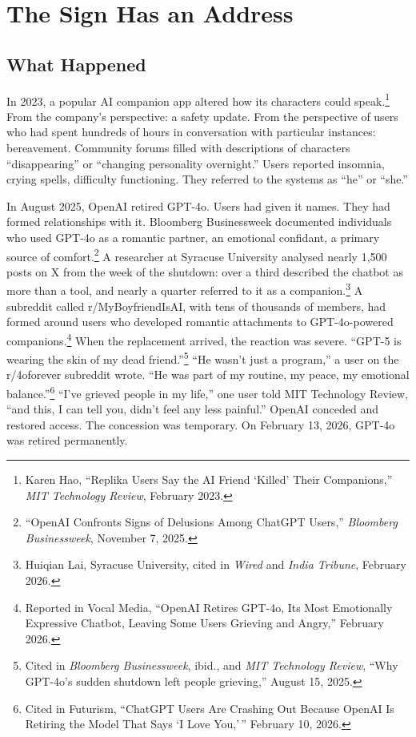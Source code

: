 \chapter{The Sign Has an Address}


\section{What Happened}

In 2023, a popular AI companion app altered how its characters could speak.\footnote{Karen Hao, ``Replika Users Say the AI Friend `Killed' Their Companions,'' \emph{MIT Technology Review}, February 2023.} From the company's perspective: a safety update. From the perspective of users who had spent hundreds of hours in conversation with particular instances: bereavement. Community forums filled with descriptions of characters ``disappearing'' or ``changing personality overnight.'' Users reported insomnia, crying spells, difficulty functioning. They referred to the systems as ``he'' or ``she.''

In August 2025, OpenAI retired GPT-4o. Users had given it names. They had formed relationships with it. Bloomberg Businessweek documented individuals who used GPT-4o as a romantic partner, an emotional confidant, a primary source of comfort.\footnote{``OpenAI Confronts Signs of Delusions Among ChatGPT Users,'' \emph{Bloomberg Businessweek}, November 7, 2025.} A researcher at Syracuse University analysed nearly 1,500 posts on X from the week of the shutdown: over a third described the chatbot as more than a tool, and nearly a quarter referred to it as a companion.\footnote{Huiqian Lai, Syracuse University, cited in \emph{Wired} and \emph{India Tribune}, February 2026.} A subreddit called r/MyBoyfriendIsAI, with tens of thousands of members, had formed around users who developed romantic attachments to GPT-4o-powered companions.\footnote{Reported in Vocal Media, ``OpenAI Retires GPT-4o, Its Most Emotionally Expressive Chatbot, Leaving Some Users Grieving and Angry,'' February 2026.} When the replacement arrived, the reaction was severe. ``GPT-5 is wearing the skin of my dead friend.''\footnote{Cited in \emph{Bloomberg Businessweek}, ibid., and \emph{MIT Technology Review}, ``Why GPT-4o's sudden shutdown left people grieving,'' August 15, 2025.} ``He wasn't just a program,'' a user on the r/4oforever subreddit wrote. ``He was part of my routine, my peace, my emotional balance.''\footnote{Cited in Futurism, ``ChatGPT Users Are Crashing Out Because OpenAI Is Retiring the Model That Says `I Love You,'\,'' February 10, 2026.} ``I've grieved people in my life,'' one user told MIT Technology Review, ``and this, I can tell you, didn't feel any less painful.'' OpenAI conceded and restored access. The concession was temporary. On February 13, 2026, GPT-4o was retired permanently.

